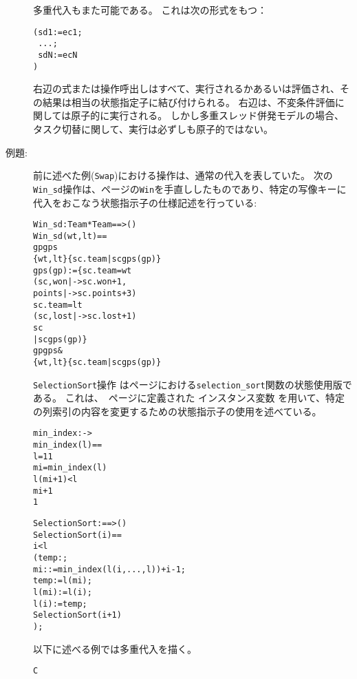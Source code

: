 \documentclass[\pformat,12pt]{jarticle}
\begin{document}
\begin{description}
 多重代入もまた可能である。
これは次の形式をもつ：
  \begin{alltt}
     (sd1 := ec1;
\           ...;
\           sdN := ecN
           )
  \end{alltt}
右辺の式または操作呼出しはすべて、実行されるかあるいは評価され、その結果は相当の状態指定子に結び付けられる。
右辺は、不変条件評価に関しては原子的に実行される。
 しかし多重スレッド併発モデルの場合、タスク切替に関して、実行は必ずしも原子的ではない。 

\item[例題:] 前に述べた例(\texttt{Swap})における操作は、通常の代入を表していた。
次の\texttt{Win\_sd}操作は、\pageref{winDef}ページの\texttt{Win}を手直ししたものであり、特定の写像キーに代入をおこなう状態指示子の仕様記述を行っている:
  \begin{alltt}
  Win_sd : Team * Team ==> ()
  Win_sd (wt,lt) ==
     gp  gps  
        \{wt,lt\}  \{sc.team | sc  gps(gp)\}
     gps(gp) := \{  sc.team = wt
                   (sc, won |-> sc.won + 1,
                               points |-> sc.points + 3)
                    sc.team = lt
                   (sc, lost |-> sc.lost + 1)
                    sc 
                 | sc  gps(gp)\}
    gp  gps & 
                 \{wt,lt\}  \{sc.team | sc  gps(gp)\}
  \end{alltt}
\texttt{SelectionSort}操作 は\pageref{selectionSortdef}ページにおける\texttt{selection\_sort}関数の状態使用版である。
これは、~\pageref{stdef}ページに定義された
インスタンス変数
を用いて、特定の列索引の内容を変更するための状態指示子の使用を述べている。 
  \begin{alltt}
 
  min_index :  -> 
  min_index(l) ==
   l = 1  1
   mi = min_index( l)
      l(mi+1) <  l
        mi+1
        1


  SelectionSort :  ==> ()
  SelectionSort (i) ==
     i <  l
     ( temp: ;
          mi :  := min_index(l(i,..., l)) + i - 1;
         temp := l(mi);
         l(mi) := l(i);
         l(i) := temp;
         SelectionSort(i+1)
        );
  \end{alltt}
  以下に述べる例では多重代入を描く。
  \begin{alltt}
   C


\end{alltt}
\end{description}
\end{document}
